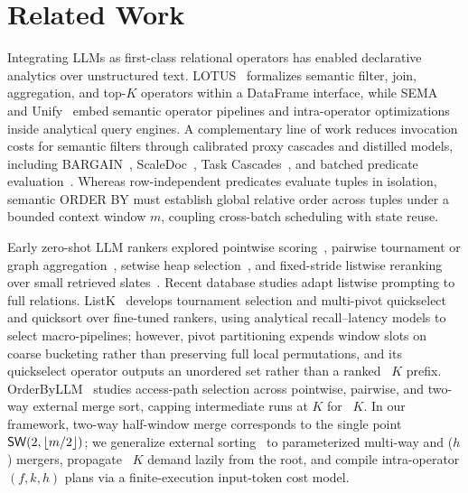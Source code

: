 \section{Related Work}
\label{sec:relatedwork}

Integrating LLMs as first-class relational operators has enabled declarative analytics over unstructured text. LOTUS~\cite{DBLP:journals/pvldb/PatelJPGAGZ25} formalizes semantic filter, join, aggregation, and top-$K$ operators within a DataFrame interface, while SEMA~\cite{DBLP:journals/corr/abs-2603-11622} and Unify~\cite{DBLP:journals/pvldb/WangLWXL25} embed semantic operator pipelines and intra-operator optimizations inside analytical query engines. A complementary line of work reduces invocation costs for semantic filters through calibrated proxy cascades and distilled models, including BARGAIN~\cite{DBLP:journals/pacmmod/ZeighamiSP25}, ScaleDoc~\cite{DBLP:journals/corr/abs-2509-12610}, Task Cascades~\cite{DBLP:journals/corr/abs-2601-05536}, and batched predicate evaluation~\cite{DBLP:journals/corr/abs-2603-04799}. Whereas row-independent predicates evaluate tuples in isolation, semantic \textsf{ORDER BY} must establish global relative order across tuples under a bounded context window $m$, coupling cross-batch scheduling with state reuse.

Early zero-shot LLM rankers explored pointwise scoring~\cite{DBLP:conf/emnlp/DrozdovZD0RWAIM23,DBLP:conf/emnlp/SachanLJAYPZ22}, pairwise tournament or graph aggregation~\cite{DBLP:conf/acl/LuoCH024,DBLP:conf/naacl/QinJHZWYSLLMWB24}, setwise heap selection~\cite{DBLP:conf/sigir/ZhuangZKZ24}, and fixed-stride listwise reranking over small retrieved slates~\cite{DBLP:conf/emnlp/0001YMWRCYR23,DBLP:journals/corr/abs-2305-02156,DBLP:conf/ecir/HouZLLXMZ24}. Recent database studies adapt listwise prompting to full relations. ListK~\cite{DBLP:journals/corr/abs-2603-17223} develops tournament selection and multi-pivot quickselect and quicksort over fine-tuned rankers, using analytical recall--latency models to select macro-pipelines; however, pivot partitioning expends window slots on coarse bucketing rather than preserving full local permutations, and its quickselect operator outputs an unordered set rather than a ranked \LIMIT~$K$ prefix. OrderByLLM~\cite{DBLP:journals/corr/abs-2509-00303} studies access-path selection across pointwise, pairwise, and two-way external merge sort, capping intermediate runs at $K$ for \LIMIT~$K$. In our framework, two-way half-window merge corresponds to the single point ${\mathsf{SW}}{}(2,\lfloor m/2\rfloor)$; we generalize external sorting~\cite{DBLP:journals/csur/Graefe06} to parameterized multi-way \SW{} and \LT($h$) mergers, propagate \LIMIT~$K$ demand lazily from the root, and compile intra-operator $(f,k,h)$ plans via a finite-execution input-token cost model.


